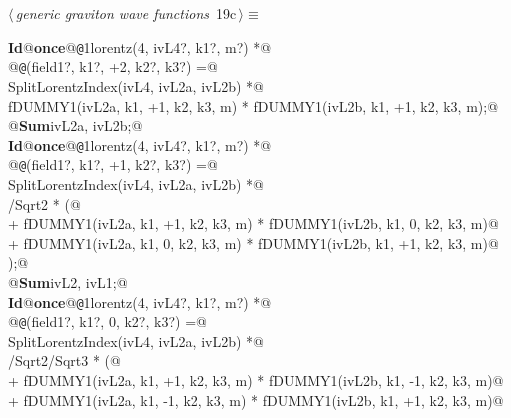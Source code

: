 \documentclass[a4paper,12pt]{amsart}
\renewcommand{\NWtarget}[2]{\hypertarget{#1}{#2}}
\begin{document}
\begin{flushleft} \small\label{scrap41}\raggedright\small
\NWtarget{nuweb19c}{} $\langle\,${\itshape generic graviton wave functions}\nobreak\ {\footnotesize {19c}}$\,\rangle\equiv$
\vspace{-1ex}
\begin{list}{}{} \item
\mbox{}\verb@@\hbox{\sffamily\bfseries Id}\verb@ @\hbox{\sffamily\bfseries once}\verb@ @{\tt @}\verb@1lorentz(4, ivL4?, k1?, m?) *@\\
\mbox{}\verb@      @{\tt @}(field1?, k1?, +2, k2?, k3?) =@\\
\mbox{}\verb@   SplitLorentzIndex(ivL4, ivL2a, ivL2b) *@\\
\mbox{}\verb@   fDUMMY1(ivL2a, k1, +1, k2, k3, m) * fDUMMY1(ivL2b, k1, +1, k2, k3, m);@\\
\mbox{}\verb@   @\hbox{\sffamily\bfseries Sum}\verb@ ivL2a, ivL2b;@\\
\mbox{}\verb@@\hbox{\sffamily\bfseries Id}\verb@ @\hbox{\sffamily\bfseries once}\verb@ @{\tt @}\verb@1lorentz(4, ivL4?, k1?, m?) *@\\
\mbox{}\verb@      @{\tt @}(field1?, k1?, +1, k2?, k3?) =@\\
\mbox{}\verb@   SplitLorentzIndex(ivL4, ivL2a, ivL2b) *@\\
\mbox{}/Sqrt2 * (@\\
\mbox{}\verb@      + fDUMMY1(ivL2a, k1, +1, k2, k3, m) * fDUMMY1(ivL2b, k1,  0, k2, k3, m)@\\
\mbox{}\verb@      + fDUMMY1(ivL2a, k1,  0, k2, k3, m) * fDUMMY1(ivL2b, k1, +1, k2, k3, m)@\\
\mbox{}\verb@   );@\\
\mbox{}\verb@   @\hbox{\sffamily\bfseries Sum}\verb@ ivL2, ivL1;@\\
\mbox{}\verb@@\hbox{\sffamily\bfseries Id}\verb@ @\hbox{\sffamily\bfseries once}\verb@ @{\tt @}\verb@1lorentz(4, ivL4?, k1?, m?) *@\\
\mbox{}\verb@      @{\tt @}(field1?, k1?,  0, k2?, k3?) =@\\
\mbox{}\verb@   SplitLorentzIndex(ivL4, ivL2a, ivL2b) *@\\
\mbox{}/Sqrt2/Sqrt3 * (@\\
\mbox{}\verb@      + fDUMMY1(ivL2a, k1, +1, k2, k3, m) * fDUMMY1(ivL2b, k1, -1, k2, k3, m)@\\
\mbox{}\verb@      + fDUMMY1(ivL2a, k1, -1, k2, k3, m) * fDUMMY1(ivL2b, k1, +1, k2, k3, m)@\\

\end{list}
\end{flushleft}
\end{document}
